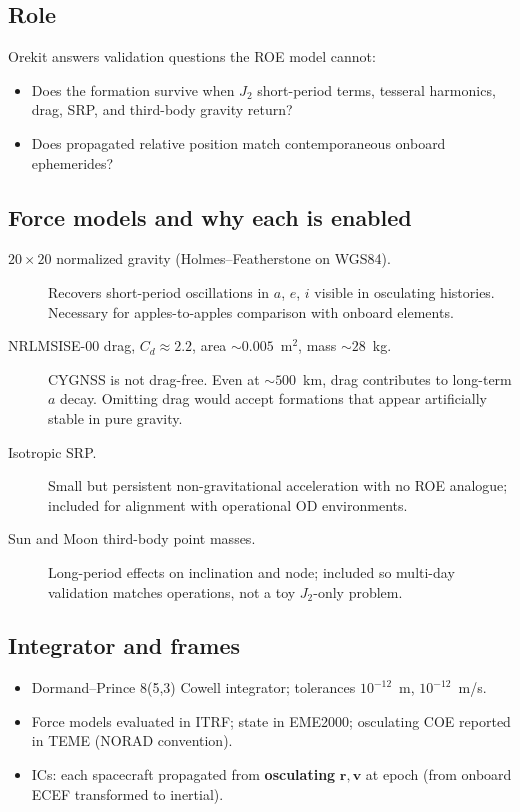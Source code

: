 \documentclass[11pt]{article}
\begin{document}
\subsection{Role}

Orekit answers validation questions the ROE model cannot:
\begin{itemize}
    \item Does the formation survive when $J_2$ short-period terms, tesseral harmonics, drag, SRP, and third-body gravity return?
    \item Does propagated relative position match contemporaneous onboard ephemerides?
\end{itemize}

\subsection{Force models and why each is enabled}

\begin{description}
    \item[$20\times 20$ normalized gravity (Holmes--Featherstone on WGS84).]
    Recovers short-period oscillations in $a$, $e$, $i$ visible in osculating histories. Necessary for apples-to-apples comparison with onboard elements.

    \item[NRLMSISE-00 drag, $C_d \approx 2.2$, area $\sim 0.005$~m$^2$, mass $\sim 28$~kg.]
    CYGNSS is not drag-free. Even at $\sim 500$~km, drag contributes to long-term $a$ decay. Omitting drag would accept formations that appear artificially stable in pure gravity.

    \item[Isotropic SRP.]
    Small but persistent non-gravitational acceleration with no ROE analogue; included for alignment with operational OD environments.

    \item[Sun and Moon third-body point masses.]
    Long-period effects on inclination and node; included so multi-day validation matches operations, not a toy $J_2$-only problem.
\end{description}

\subsection{Integrator and frames}

\begin{itemize}
    \item Dormand--Prince 8(5,3) Cowell integrator; tolerances $10^{-12}$~m, $10^{-12}$~m/s.
    \item Force models evaluated in ITRF; state in EME2000; osculating COE reported in TEME (NORAD convention).
    \item ICs: each spacecraft propagated from \textbf{osculating} $\mathbf{r},\mathbf{v}$ at epoch (from onboard ECEF transformed to inertial).
\end{itemize}
\end{document}

